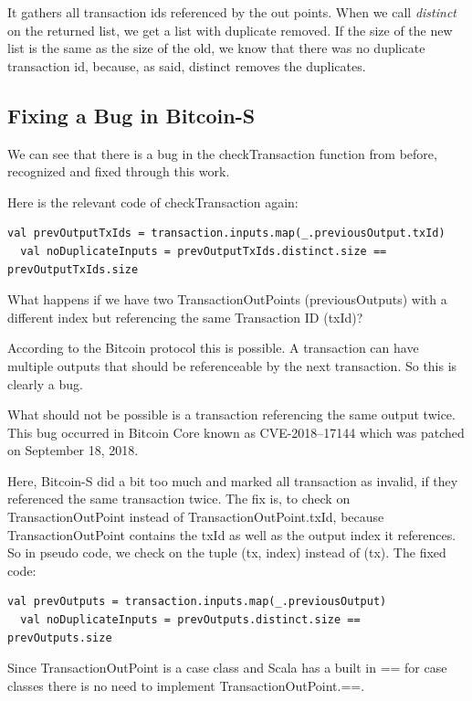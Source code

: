 \documentclass[runningheads]{llncs}
\begin{document}
It gathers all transaction ids referenced by the out points.  When we
call \emph{distinct} on the returned list, we get a list with
duplicate removed.  If the size of the new list is the same as the
size of the old, we know that there was no duplicate transaction id,
because, as said, distinct removes the duplicates.


\subsection{Fixing a Bug in Bitcoin-S}
\label{sec:bugfix}

We can see that there is a bug in the checkTransaction function from
before, recognized and fixed through this work.

Here is the relevant code of checkTransaction again:
\begin{lstlisting}[style=scala]
  val prevOutputTxIds = transaction.inputs.map(_.previousOutput.txId)
  val noDuplicateInputs = prevOutputTxIds.distinct.size == prevOutputTxIds.size
\end{lstlisting}

What happens if we have two TransactionOutPoints (previousOutputs) with a different index but referencing the same Transaction ID (txId)?

According to the Bitcoin protocol this is possible.  A transaction can
have multiple outputs that should be referenceable by the next
transaction.  So this is clearly a bug.

What should not be possible is a transaction referencing the same
output twice.  This bug occurred in Bitcoin Core known as
CVE-2018–17144 which was patched on September 18,
2018. \cite{cve201817144}

Here, Bitcoin-S did a bit too much and marked all transaction as
invalid, if they referenced the same transaction twice.  The fix is,
to check on TransactionOutPoint instead of TransactionOutPoint.txId,
because TransactionOutPoint contains the txId as well as the output
index it references.  So in pseudo code, we check on the tuple (tx,
index) instead of (tx).  The fixed code:
\begin{lstlisting}[style=scala]
  val prevOutputs = transaction.inputs.map(_.previousOutput)
  val noDuplicateInputs = prevOutputs.distinct.size == prevOutputs.size
\end{lstlisting}

Since TransactionOutPoint is a case class and Scala has a built in ==
for case classes there is no need to implement TransactionOutPoint.==.
\end{document}
